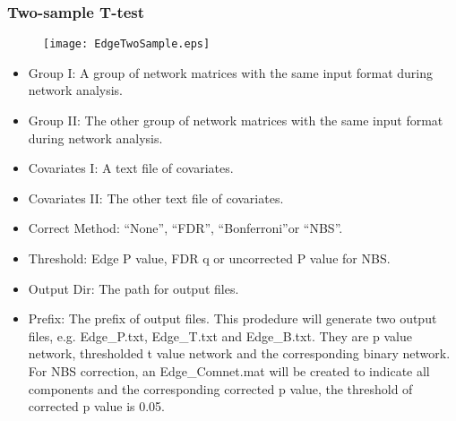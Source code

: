 \documentclass[11pt]{article}
\begin{document}
            \subsubsection{Two-sample T-test}
				\begin{figure}
					\begin{center}
						\texttt{[image: EdgeTwoSample.eps]}
					\end{center}
				\end{figure}
                \begin{itemize}
                    \item Group I: A group of network matrices with the same input format 
                        during network analysis.
                    \item Group II: The other group of network matrices with the same input 
                        format during network analysis.
                    \item Covariates I: A text file of covariates.
                    \item Covariates II: The other text file of covariates.
                    \item Correct Method: ``None'', ``FDR'', ``Bonferroni''or ``NBS''.
                    \item Threshold: Edge P value, FDR q or uncorrected P value for NBS.
                    \item Output Dir: The path for output files.
                    \item Prefix: The prefix of output files. This prodedure will generate
                        two output files, e.g. Edge\_P.txt, Edge\_T.txt and Edge\_B.txt. 
                        They are p value network, thresholded t value network and the 
                        corresponding binary network. For NBS correction, an Edge\_Comnet.mat
                        will be created to indicate all components and the corresponding 
                        corrected p value, the threshold of corrected p value is 0.05.
                \end{itemize}
\end{document}
